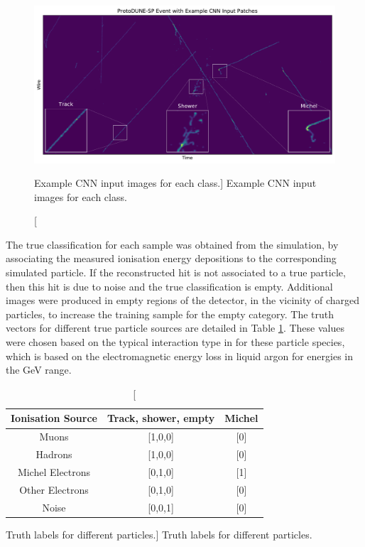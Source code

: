 \begin{figure}
	\centering
	\includegraphics[width=\textwidth]{figures/patch_zoom.pdf}  
	\caption
	[Example CNN input images for each class.]
	{Example CNN input images for each class.}
	\label{fig:patches}
\end{figure}

The true classification for each sample was obtained from the simulation, by 
associating the measured ionisation energy depositions to the corresponding
simulated particle. If the reconstructed hit is not associated to a true
particle, then this hit is due to noise and the true classification is empty.
Additional images were produced in empty regions of the detector, in the 
vicinity of charged particles, to increase the training sample for the empty 
category. The truth vectors for different true particle sources are detailed 
in Table \ref{tab:ground_truth}. These values were chosen based on the typical 
interaction type in \protodune{} for these particle species, which is based on 
the electromagnetic energy loss in liquid argon for energies in the GeV range.
\begin{table}
	\centering
	\bgroup
	\def\arraystretch{1.5}
	\begin{tabular}{c|c|c}
		Ionisation Source & Track, shower, empty & Michel \\ \hline
		Muons             & [1,0,0]              & [0]    \\
		Hadrons           & [1,0,0]              & [0]    \\
		Michel Electrons  & [0,1,0]              & [1]    \\
		Other Electrons   & [0,1,0]              & [0]    \\
		Noise             & [0,0,1]              & [0]    \\
	\end{tabular}
	\egroup
	\caption
	[Truth labels for different particles.]
	{Truth labels for different particles.}
	\label{tab:ground_truth}
\end{table}

